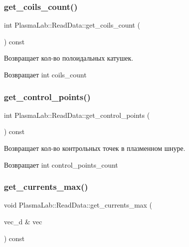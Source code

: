 \subsubsection{\texorpdfstring{get\+\_\+coils\+\_\+count()}{get\_coils\_count()}}
{\footnotesize\ttfamily int Plasma\+Lab\+::\+Read\+Data\+::get\+\_\+coils\+\_\+count (\begin{DoxyParamCaption}{ }\end{DoxyParamCaption}) const\hspace{0.3cm}{\ttfamily [inline]}}

Возвращает кол-\/во полоидальных катушек. \begin{DoxyReturn}{Возвращает}
int coils\+\_\+count 
\end{DoxyReturn}
\mbox{\label{class_plasma_lab_1_1_read_data_ac0400550fc67a0f600ace130cd2bd836}} 
\subsubsection{\texorpdfstring{get\+\_\+control\+\_\+points()}{get\_control\_points()}}
{\footnotesize\ttfamily int Plasma\+Lab\+::\+Read\+Data\+::get\+\_\+control\+\_\+points (\begin{DoxyParamCaption}{ }\end{DoxyParamCaption}) const\hspace{0.3cm}{\ttfamily [inline]}}

Возвращает кол-\/во контрольных точек в плазменном шнуре. \begin{DoxyReturn}{Возвращает}
int control\+\_\+points\+\_\+count 
\end{DoxyReturn}
\mbox{\label{class_plasma_lab_1_1_read_data_af0f0e8aaaa2ed22c3e849bda7aca68e3}} 
\subsubsection{\texorpdfstring{get\+\_\+currents\+\_\+max()}{get\_currents\_max()}}
{\footnotesize\ttfamily void Plasma\+Lab\+::\+Read\+Data\+::get\+\_\+currents\+\_\+max (\begin{DoxyParamCaption}\item[{vec\+\_\+d \&}]{vec }\end{DoxyParamCaption}) const\hspace{0.3cm}{\ttfamily [inline]}}

